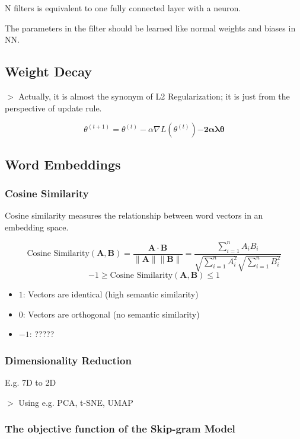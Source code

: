 \documentclass[12pt,a4paper]{article}
\newcommand{\remark}[1]{
    $>$ {\color{blue} #1}
}
\begin{document}
N filters is equivalent to one fully connected layer with a neuron.

The parameters in the filter should be learned like normal weights and biases in NN.

\subsection*{Weight Decay}

\remark{Actually, it is almost the synonym of L2 Regularization; it is just from the perspective of update rule.}

\[\theta^{(t+1)} = \theta^{(t)} - \alpha \nabla L(\theta^{(t)}) \mathbf{- 2\alpha\lambda\theta}\]

\subsection*{Word Embeddings}

\subsubsection*{Cosine Similarity}

Cosine similarity measures the relationship between word vectors in an embedding space.

\[\text{Cosine Similarity}(\mathbf{A}, \mathbf{B}) = \frac{\mathbf{A} \cdot \mathbf{B}}{\|\mathbf{A}\| \|\mathbf{B}\|} = \frac{\sum_{i=1}^{n} A_i B_i}{\sqrt{\sum_{i=1}^{n} A_i^2} \sqrt{\sum_{i=1}^{n} B_i^2}}\]
\[-1 \ge \text{Cosine Similarity}(\mathbf{A}, \mathbf{B}) \le 1\]

\begin{itemize}
    \item $1$: Vectors are identical (high semantic similarity)
    \item $0$: Vectors are orthogonal (no semantic similarity)
    \item $-1$: ?????
\end{itemize}

\subsubsection*{Dimensionality Reduction}

E.g. 7D to 2D

\remark{Using e.g. PCA, t-SNE, UMAP}

\subsubsection*{The objective function of the Skip-gram Model}
\end{document}
